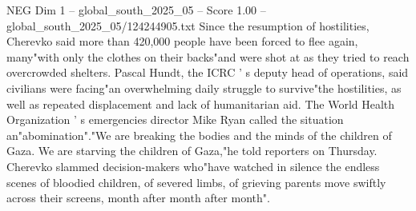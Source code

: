 \begin{textsample}{NEG Dim 1 – global\_south\_2025\_05 – Score 1.00 – global\_south\_2025\_05/124244905.txt}
Since the resumption of hostilities, Cherevko said more than 420,000 people have been forced to flee again, many"with only the clothes on their backs"and were shot at as they tried to reach overcrowded shelters.
Pascal Hundt, the ICRC ' s deputy head of operations, said civilians were facing"an overwhelming daily struggle to survive"the hostilities, as well as repeated displacement and lack of humanitarian aid.
The World Health Organization ' s emergencies director Mike Ryan called the situation an"abomination"."We are breaking the bodies and the minds of the children of Gaza.
We are starving the children of Gaza,"he told reporters on Thursday.
Cherevko slammed decision-makers who"have watched in silence the endless scenes of bloodied children, of severed limbs, of grieving parents move swiftly across their screens, month after month after month".

\end{textsample}
